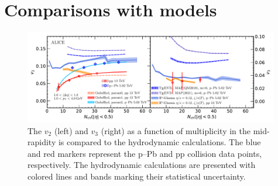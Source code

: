 
\section{Comparisons with models}
\label{sec:theory}

\begin{figure}[h!]
	\centering
	\includegraphics[width=0.99\textwidth]{figures/Fig6_v2Mult_allSystems_Hydro.pdf} 
	\caption{The $v_2$ (left) and $v_3$ (right) as a function of multiplicity in the mid-rapidity is compared to the hydrodynamic calculations. The blue and red markers represent the p--Pb and pp collision data points, respectively. The hydrodynamic calculations are presented with colored lines and bands marking their statistical uncertainty.} 
	\label{fig:vnmult_model}
\end{figure}

